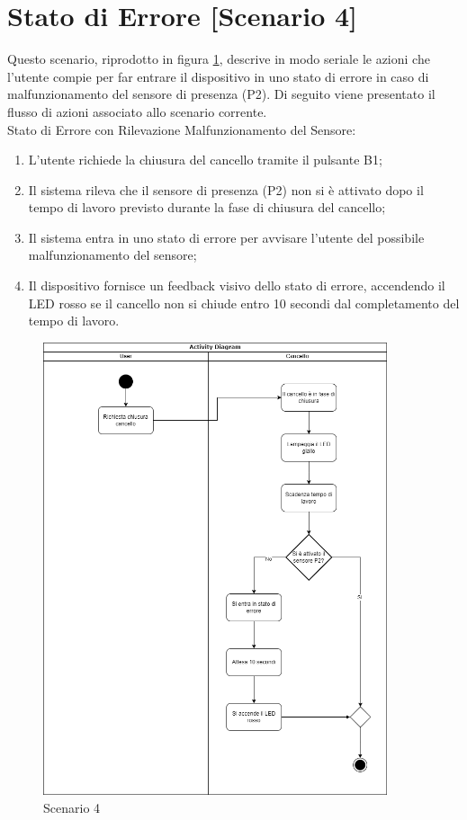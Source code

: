 \section{Stato di Errore [Scenario 4]}
Questo scenario, riprodotto in figura \ref{scenario4}, descrive in modo seriale le azioni che l’utente compie per far entrare il dispositivo in uno stato di errore in caso di malfunzionamento del sensore di presenza (P2).
Di seguito viene presentato il flusso di azioni associato allo scenario corrente. \\

\noindent Stato di Errore con Rilevazione Malfunzionamento del Sensore:

\begin{enumerate}
    \item L’utente richiede la chiusura del cancello tramite il pulsante B1;
    \item Il sistema rileva che il sensore di presenza (P2) non si è attivato dopo il tempo di lavoro previsto durante la fase di chiusura del cancello;
    \item Il sistema entra in uno stato di errore per avvisare l’utente del possibile malfunzionamento del sensore;
    \item Il dispositivo fornisce un feedback visivo dello stato di errore, accendendo il LED rosso se il cancello non si chiude entro 10 secondi dal completamento del tempo di lavoro.
\end{enumerate}

\begin{figure}[H]
    \centering
    \includegraphics[width=0.9\textwidth]{figures/scenario4.drawio.png}
    \caption{Scenario 4}
    \label{scenario4}
\end{figure}


